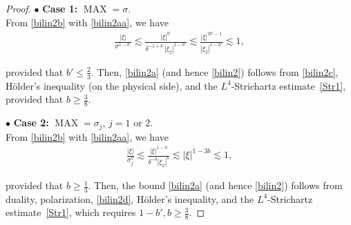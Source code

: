 \documentclass[letterpaper, 11pt,  reqno]{amsart}
\DeclareMathOperator{\MAX}{MAX}
\newcommand{\1}{\hspace{0.5mm}\textup{I}\hspace{0.5mm}}
\newcommand{\noi}{\noindent}
\newcommand{\bul}{\bullet}
\newcommand{\dl}{\delta}
\newcommand{\s}{\sigma}
\newcommand{\les}{\lesssim}
\numberwithin{equation}{section}
\numberwithin{theorem}{section}
\begin{document}
\begin{proof}
\medskip

\noi
$\bul$ {\bf Case 1:}
$\MAX = \s$.
\\
\indent
From \eqref{bilin2b} with \eqref{bilin2aa}, we have 
\begin{align}
\frac{ |\xi|}{\s^{1-b'}}
\les \frac{|\xi|^{b'}}{\dl^{-1 + b'} |\xi_2|^{1-b'}}
\les \frac{|\xi|^{2b'-1}}{ |\xi_2|^{1-b'}}
\les 1,
\label{bilin2c} 
\end{align}

\noi
provided that $b' \le \frac 23 $.
Then, \eqref{bilin2a} 
(and hence \eqref{bilin2})
follows from \eqref{bilin2c}, 
H\"older's inequality (on the physical side), and the $L^4$-Strichartz estimate~\eqref{Str1}, 
provided that $b \ge \frac 38$.


\medskip

\noi
$\bul$ {\bf Case 2:}
$\MAX = \s_j$, $j = 1$ or $2$.
\\
\indent
From \eqref{bilin2b} with \eqref{bilin2aa}, we have 
\begin{align}
\frac{ |\xi|}{\s_j^{b}}
\les \frac{|\xi|^{1-b}}{\dl^{-b} |\xi_2|^{b}}
\les |\xi|^{1-3b}
\les 1,
\label{bilin2d} 
\end{align}

\noi
provided that $b \ge \frac 13  $.
Then, the bound \eqref{bilin2a}
(and hence \eqref{bilin2})
follows from 
duality, polarization,  
\eqref{bilin2d}, 
H\"older's inequality, and the $L^4$-Strichartz estimate~\eqref{Str1}, 
which requires $1 - b', b \ge \frac 38$.
\end{proof}
\end{document}
